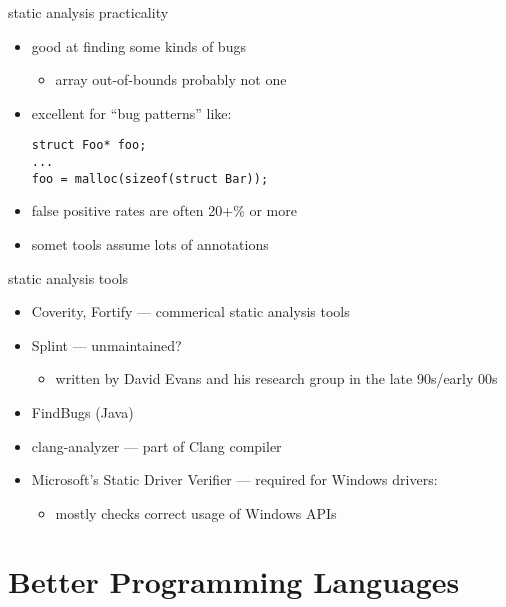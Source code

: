 \begin{frame}[fragile,label=practic]{static analysis practicality}
    \begin{itemize}
    \item good at finding some kinds of bugs
        \begin{itemize}
        \item array out-of-bounds probably not one
        \end{itemize}
    \item excellent for ``bug patterns'' like:
\begin{lstlisting}
struct Foo* foo;
...
foo = malloc(sizeof(struct Bar));
\end{lstlisting}
    \item false positive rates are often 20+\% or more
    \item somet tools assume lots of annotations
    \end{itemize}
\end{frame}

\begin{frame}{static analysis tools}
    \begin{itemize}
    \item Coverity, Fortify --- commerical static analysis tools
    \item Splint --- unmaintained?
            \begin{itemize}
                \item written by David Evans and his research group in the late 90s/early 00s
            \end{itemize}
    \item FindBugs (Java)
    \item clang-analyzer --- part of Clang compiler
    \item Microsoft's Static Driver Verifier  --- required for Windows drivers:
        \begin{itemize}
            \item mostly checks correct usage of Windows APIs
        \end{itemize}
    \end{itemize}
\end{frame}


\section*{Better Programming Languages}

